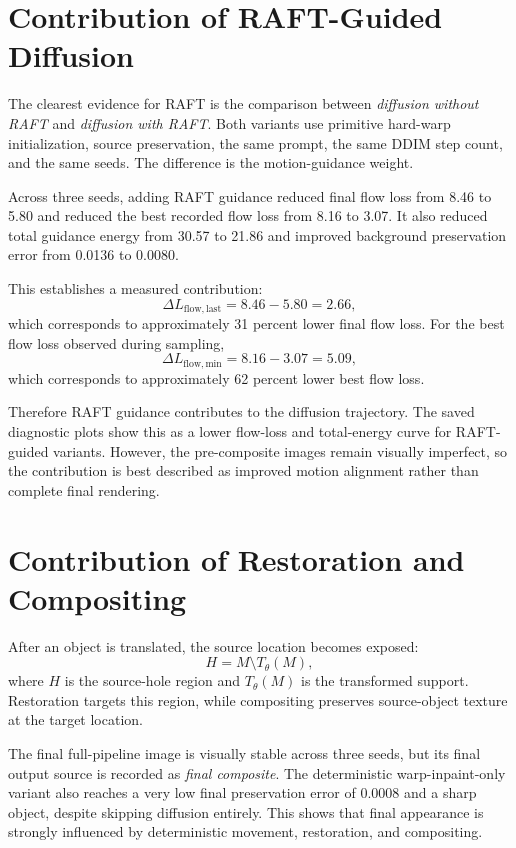 \section{Contribution of RAFT-Guided Diffusion}

The clearest evidence for RAFT is the comparison between \emph{diffusion without RAFT} and \emph{diffusion with RAFT}. Both variants use primitive hard-warp initialization, source preservation, the same prompt, the same DDIM step count, and the same seeds. The difference is the motion-guidance weight.

Across three seeds, adding RAFT guidance reduced final flow loss from 8.46 to 5.80 and reduced the best recorded flow loss from 8.16 to 3.07. It also reduced total guidance energy from 30.57 to 21.86 and improved background preservation error from 0.0136 to 0.0080.

This establishes a measured contribution:
\begin{equation}
  \Delta L_{\mathrm{flow,last}}
  = 8.46 - 5.80 = 2.66,
\end{equation}
which corresponds to approximately 31 percent lower final flow loss. For the best flow loss observed during sampling,
\begin{equation}
  \Delta L_{\mathrm{flow,min}}
  = 8.16 - 3.07 = 5.09,
\end{equation}
which corresponds to approximately 62 percent lower best flow loss.

Therefore RAFT guidance contributes to the diffusion trajectory. The saved diagnostic plots show this as a lower flow-loss and total-energy curve for RAFT-guided variants. However, the pre-composite images remain visually imperfect, so the contribution is best described as improved motion alignment rather than complete final rendering.

\section{Contribution of Restoration and Compositing}

After an object is translated, the source location becomes exposed:
\begin{equation}
  H = M \setminus T_\theta(M),
\end{equation}
where $H$ is the source-hole region and $T_\theta(M)$ is the transformed support. Restoration targets this region, while compositing preserves source-object texture at the target location.

The final full-pipeline image is visually stable across three seeds, but its final output source is recorded as \emph{final composite}. The deterministic warp-inpaint-only variant also reaches a very low final preservation error of 0.0008 and a sharp object, despite skipping diffusion entirely. This shows that final appearance is strongly influenced by deterministic movement, restoration, and compositing.


